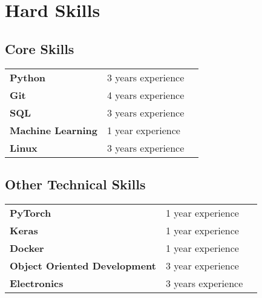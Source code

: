 \documentclass[9pt]{article}
\begin{document}
    \section*{Hard Skills}
    \begin{minipage}[ht]{0.48\textwidth}
        \subsection*{Core Skills}
        \begin{tabular}{lll}
            \bf Python&3 years experience\\
            \bf Git&4 years experience\\
            \bf SQL&3 years experience\\
            \bf Machine Learning&1 year experience\\
            \bf Linux&3 years experience\\
        \end{tabular}
    \end{minipage}
    \begin{minipage}[ht]{0.48\textwidth}
        \subsection*{Other Technical Skills}
        \begin{tabular}{lll}
            \bf PyTorch&1 year experience\\
            \bf Keras&1 year experience\\
            \bf Docker&1 year experience\\
            \bf Object Oriented Development&3 year experience\\
            \bf Electronics &3 years experience\\
        \end{tabular}
    \end{minipage}
\end{document}
